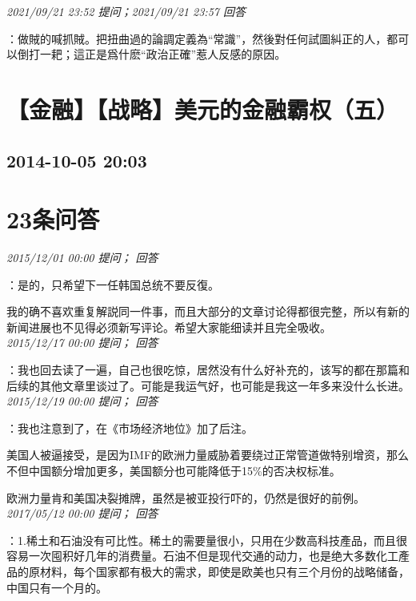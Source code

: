 \documentclass[twocolumn]{ctexart}
\begin{document}
\textit{\hfill\noindent\small 2021/09/21 23:52 提问；2021/09/21 23:57 回答}

：做賊的喊抓賊。把扭曲過的論調定義為“常識”，然後對任何試圖糾正的人，都可以倒打一耙；這正是爲什麽“政治正確”惹人反感的原因。
\\


\section{【金融】【战略】美元的金融霸权（五）}
\subsection{2014-10-05 20:03}


\section{23条问答}

\textit{\hfill\noindent\small 2015/12/01 00:00 提问； 回答}

：是的，只希望下一任韩国总统不要反復。

我的确不喜欢重复解説同一件事，而且大部分的文章讨论得都很完整，所以有新的新闻进展也不见得必须新写评论。希望大家能细读并且完全吸收。\\

\textit{\hfill\noindent\small 2015/12/17 00:00 提问； 回答}

：我也回去读了一遍，自己也很吃惊，居然没有什么好补充的，该写的都在那篇和后续的其他文章里谈过了。可能是我运气好，也可能是我这一年多来没什么长进。\\

\textit{\hfill\noindent\small 2015/12/19 00:00 提问； 回答}

：我也注意到了，在《市场经济地位》加了后注。

美国人被逼接受，是因为IMF的欧洲力量威胁着要绕过正常管道做特别增资，那么不但中国额分增加更多，美国额分也可能降低于15\%的否决权标准。

欧洲力量肯和美国决裂摊牌，虽然是被亚投行吓的，仍然是很好的前例。\\

\textit{\hfill\noindent\small 2017/05/12 00:00 提问； 回答}

：1.稀土和石油没有可比性。稀土的需要量很小，只用在少数高科技產品，而且很容易一次囤积好几年的消费量。石油不但是现代交通的动力，也是绝大多数化工產品的原材料，每个国家都有极大的需求，即使是欧美也只有三个月份的战略储备，中国只有一个月的。
\end{document}
